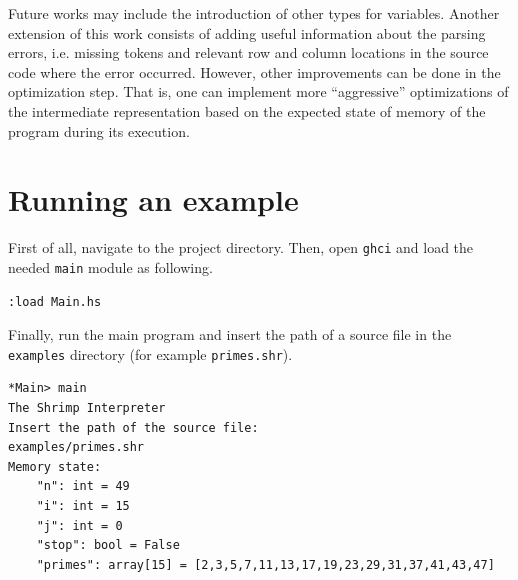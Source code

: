 \documentclass[12pt,a4paper]{article}
\begin{document}
Future works may include the introduction of other types for variables.
Another extension of this work consists of adding useful information about the parsing errors, i.e. missing tokens and relevant row and column locations in the source code where the error occurred.
However, other improvements can be done in the optimization step.
That is, one can implement more ``aggressive'' optimizations of the intermediate representation based on the expected state of memory of the program during its execution.

\clearpage

\section*{Running an example}
First of all, navigate to the project directory.
Then, open \texttt{ghci} and load the needed \texttt{main} module as following.
\begin{lstlisting}[style=custom-style]
:load Main.hs
\end{lstlisting}
Finally, run the main program and insert the path of a source file in the \texttt{examples} directory (for example \texttt{primes.shr}).
\begin{lstlisting}[style=custom-style]
*Main> main
The Shrimp Interpreter
Insert the path of the source file:
examples/primes.shr
Memory state:
    "n": int = 49
    "i": int = 15
    "j": int = 0
    "stop": bool = False
    "primes": array[15] = [2,3,5,7,11,13,17,19,23,29,31,37,41,43,47]
\end{lstlisting}
\end{document}
